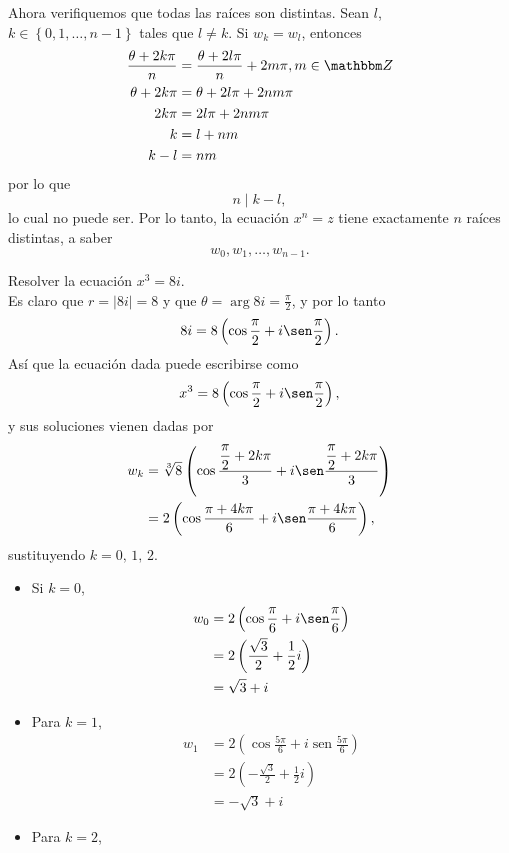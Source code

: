 Ahora verifiquemos que todas las raíces son distintas. Sean $l$, $k \in \left\{ 0,  1,  \dots,  n-1 \right\}$ tales que $l \neq k$. Si $w_k=w_l$, entonces
\begin{align*}
    \frac{\theta +2k\pi}{n} &= \frac{\theta +2l\pi}{n}+2m\pi,  m \in \ZZ \\
    \theta +2k\pi &= \theta +2l\pi +2nm\pi \\
    2k\pi &=2l\pi +2nm\pi \\
    k &=l+nm \\
    k-l &=nm
\end{align*}
por lo que
$$n \mid k-l,$$
lo cual no puede ser. Por lo tanto, la ecuación $x^n=z$ tiene exactamente $n$ raíces distintas, a saber
$$w_0,  w_1,  \dots,  w_{n-1}.$$

\begin{example}
    Resolver la ecuación $x^3=8 i$. \\
    \solucion Es claro que $r=|8 i|=8$ y que $\displaystyle  \theta=\arg 8 i=\frac{\pi}{2}$, y por lo tanto
    $$ 8 i=8\left(\cos \frac{\pi}{2}+i \sen \frac{\pi}{2}\right).$$
    Así que la ecuación dada puede escribirse como
    $$x^3=8\left(\cos \frac{\pi}{2}+i \sen \frac{\pi}{2}\right),$$
    y sus soluciones vienen dadas por
    \begin{align*}
        w_k &=\sqrt[3]{8}\left(\cos \frac{\displaystyle\frac{\pi}{2}+2 k \pi}{3}+i \sen \frac{\displaystyle\frac{\pi}{2}+2 k \pi}{3}\right) \\
        &= 2 \left(\cos \frac{\pi +4k\pi}{6}+i \sen \frac{\pi +4k\pi}{6} \right),
    \end{align*}
    sustituyendo $k=0, \, 1, \,2$.
    \begin{itemize}
        \item Si $k=0$,
        $$ \begin{aligned} w_0 &=2\left(\cos \frac{\pi}{6}+i \sen \frac{\pi}{6}\right) \\ &=2\left(\frac{\sqrt{3}}{2}+\frac{1}{2} i\right) \\ &=\sqrt{3}+i \end{aligned} $$ 
        \item Para $k=1$,
        $$ \begin{aligned} w_1 &=2\left(\cos \frac{5 \pi}{6}+i \operatorname{sen} \frac{5 \pi}{6}\right) \\ &=2\left(-\frac{\sqrt{3}}{2}+\frac{1}{2} i\right) \\ &=-\sqrt{3}+i \end{aligned} $$
        \item Para $k=2$,

\end{itemize}
\end{example}
